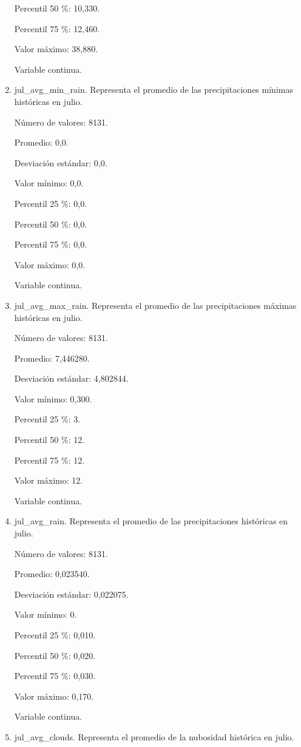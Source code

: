 \begin{enumerate}
	Percentil 50 \%: 10,330.
	
	Percentil 75 \%: 12,460.
	
	Valor máximo: 38,880.
	
	Variable continua.

	\item jul\_avg\_min\_rain. Representa el promedio de las precipitaciones mínimas históricas en julio.
	
	Número de valores: 8131.
	
	Promedio: 0,0.
	
	Desviación estándar: 0,0.
	
	Valor mínimo: 0,0.
	
	Percentil 25 \%: 0,0.
	
	Percentil 50 \%: 0,0.
	
	Percentil 75 \%: 0,0.
	
	Valor máximo: 0,0.
	
	Variable continua.

	\item jul\_avg\_max\_rain. Representa el promedio de las precipitaciones máximas históricas en julio.
	
	Número de valores: 8131.
	
	Promedio: 7,446280.
	
	Desviación estándar: 4,802844.
	
	Valor mínimo: 0,300.
	
	Percentil 25 \%: 3.
	
	Percentil 50 \%: 12.
	
	Percentil 75 \%: 12.
	
	Valor máximo: 12.
	
	Variable continua.

	\item jul\_avg\_rain. Representa el promedio de las precipitaciones históricas en julio.
	
	Número de valores: 8131.
	
	Promedio: 0,023540.
	
	Desviación estándar: 0,022075.
	
	Valor mínimo: 0.
	
	Percentil 25 \%: 0,010.
	
	Percentil 50 \%: 0,020.
	
	Percentil 75 \%: 0,030.
	
	Valor máximo: 0,170.
	
	Variable continua.

	\item jul\_avg\_clouds. Representa el promedio de la nubosidad histórica en julio.
	

\end{enumerate}
